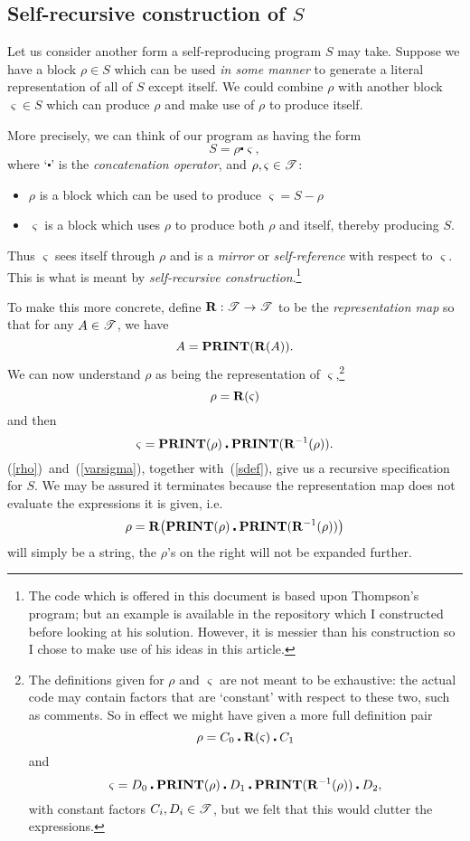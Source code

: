 \subsection{Self-recursive construction of $S$}

Let us consider another form a self-reproducing program $S$ may take.
Suppose we have a block $\rho\in{}S$ which can be used \textit{in some manner} to generate a
literal representation of all of $S$ except itself.
We could combine $\rho$ with another block $\varsigma\in{}S$ which can produce $\rho$ and make use
of $\rho$ to produce itself.

More precisely, we can think of our program as having the form
\begin{equation}\label{sdef}
    S = \rho\centerdot{}\varsigma, 
\end{equation}
where `$\centerdot$' is the {\sl concatenation operator}, and $\rho,\varsigma\in\mathscr{T}$:
\begin{itemize}
    \item $\rho$ is a block which can be used to produce $\varsigma = S-\rho$
    \item $\varsigma$ is a block which uses $\rho$ to produce both $\rho$ and itself, thereby
        producing $S$.
\end{itemize}
Thus $\varsigma$ sees itself through $\rho$ and is a \textit{mirror} or \textit{self-reference}
with respect to $\varsigma$. This is what is meant by \textit{self-recursive
construction}.\footnote{The code which is offered in this document is based upon Thompson's program;
but an example is available in the repository which I constructed before looking at his solution.
However, it is messier than his construction so I chose to make use of his ideas in this article.}

To make this more concrete, define $\mathbf{R}:\mathscr{T}\to\mathscr{T}$ to be the \textit{representation map} so that
for any $A\in\mathscr{T}$, we have
\[ A = \text{\bf PRINT}(\mathbf{R}(A)). \]
We can now understand $\rho$ as being the representation of $\varsigma$,\footnote{The definitions
given for $\rho$ and $\varsigma$ are not meant to be exhaustive: the actual code may contain factors
that are `constant' with respect to these two, such as comments. So in effect we might have given a
more full definition pair
\[ \rho = C_0\centerdot\mathbf{R}(\varsigma)\centerdot C_1 \]
and 
\[ \varsigma = D_0\centerdot\text{\bf PRINT}(\rho)\centerdot D_1\centerdot\text{\bf PRINT}(\mathbf{R}^{-1}(\rho))\centerdot D_2,\]
with constant factors $C_i,D_i\in\mathscr{T}$, but we felt that this would clutter the expressions.}
\begin{equation}\label{rho}
    \rho = \mathbf{R}(\varsigma)
\end{equation}
and then
\begin{equation}\label{varsigma}
    \varsigma = \text{\bf PRINT}(\rho)\centerdot\text{\bf PRINT}(\mathbf{R}^{-1}(\rho)).
\end{equation}
(\ref{rho})~and~(\ref{varsigma}), together with~(\ref{sdef}), give us a recursive specification for
$S$. We may be assured it terminates because the representation map does not evaluate the
expressions it is given, i.e.
\[ \rho = \mathbf{R}\big(\text{\bf PRINT}(\rho)\centerdot\text{\bf PRINT}(\mathbf{R}^{-1}(\rho))\big) \]
will simply be a string, the $\rho$'s on the right will not be expanded further.

